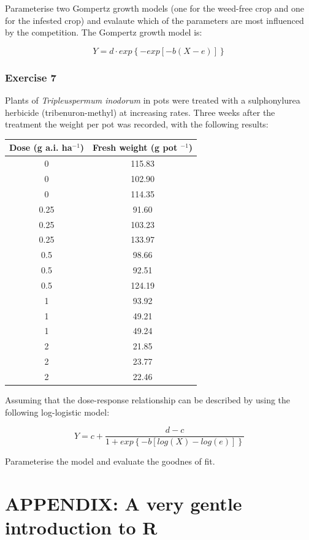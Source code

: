 \documentclass[a4paper,12pt,oneside]{book}
\begin{document}
Parameterise two Gompertz growth models (one for the weed-free crop and one for the infested crop) and evalaute which of the parameters are most influenced by the competition. The Gompertz growth model is:

\[Y = d \cdot exp\left\{- exp \left[ - b (X - e)\right] \right\}\]

\hypertarget{exercise-7-1}{%
\subsection{Exercise 7}\label{exercise-7-1}}

Plants of \emph{Tripleuspermum inodorum} in pots were treated with a sulphonylurea herbicide (tribenuron-methyl) at increasing rates. Three weeks after the treatment the weight per pot was recorded, with the following results:

\begin{longtable}[]{@{}cc@{}}
\toprule
Dose (g a.i. ha\(^{-1}\)) & Fresh weight (g pot \(^{-1}\)) \\
\midrule
\endhead
0 & 115.83 \\
0 & 102.90 \\
0 & 114.35 \\
0.25 & 91.60 \\
0.25 & 103.23 \\
0.25 & 133.97 \\
0.5 & 98.66 \\
0.5 & 92.51 \\
0.5 & 124.19 \\
1 & 93.92 \\
1 & 49.21 \\
1 & 49.24 \\
2 & 21.85 \\
2 & 23.77 \\
2 & 22.46 \\
\bottomrule
\end{longtable}

Assuming that the dose-response relationship can be described by using the following log-logistic model:

\[Y = c + \frac{d - c}{1 + exp \left\{ - b \left[ log (X) - log (e) \right] \right\}}\]

Parameterise the model and evaluate the goodnes of fit.

\hypertarget{appendix-a-very-gentle-introduction-to-r}{%
\chapter{APPENDIX: A very gentle introduction to R}\label{appendix-a-very-gentle-introduction-to-r}}
\end{document}
